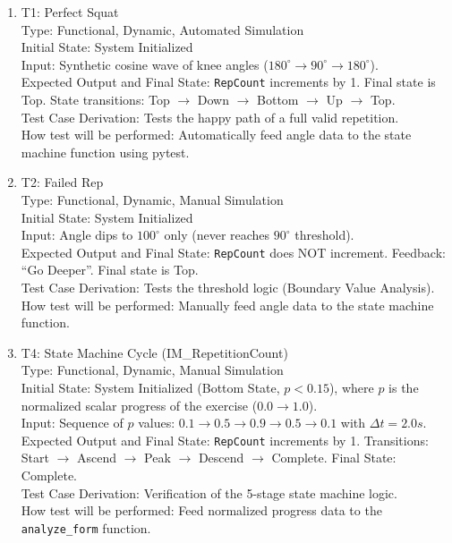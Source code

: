 \documentclass[12pt, titlepage]{article}
\begin{document}
\begin{enumerate}
\item{T1: Perfect Squat\\}
Type: Functional, Dynamic, Automated Simulation\\
Initial State: System Initialized\\
Input: Synthetic cosine wave of knee angles ($180^\circ \rightarrow 90^\circ \rightarrow 180^\circ$).\\
Expected Output and Final State: \texttt{RepCount} increments by 1. Final state is Top. State transitions: Top $\rightarrow$ Down $\rightarrow$ Bottom $\rightarrow$ Up $\rightarrow$ Top.\\
Test Case Derivation: Tests the happy path of a full valid repetition.\\
How test will be performed: Automatically feed angle data to the state machine function using pytest.

\item{T2: Failed Rep\\}
Type: Functional, Dynamic, Manual Simulation\\
Initial State: System Initialized\\
Input: Angle dips to $100^\circ$ only (never reaches $90^\circ$ threshold).\\
Expected Output and Final State: \texttt{RepCount} does NOT increment. Feedback: ``Go Deeper''. Final state is Top.\\
Test Case Derivation: Tests the threshold logic (Boundary Value Analysis).\\
How test will be performed: Manually feed angle data to the state machine function.

\item{T4: State Machine Cycle (IM\_RepetitionCount)\\}
Type: Functional, Dynamic, Manual Simulation\\
Initial State: System Initialized (Bottom State, $p < 0.15$), where $p$ is the normalized scalar progress of the exercise ($0.0 \rightarrow 1.0$).\\
Input: Sequence of $p$ values: $0.1 \rightarrow 0.5 \rightarrow 0.9 \rightarrow 0.5 \rightarrow 0.1$ with $\Delta t = 2.0s$.\\
Expected Output and Final State: \texttt{RepCount} increments by 1. Transitions: Start $\rightarrow$ Ascend $\rightarrow$ Peak $\rightarrow$ Descend $\rightarrow$ Complete. Final State: Complete.\\
Test Case Derivation: Verification of the 5-stage state machine logic.\\
How test will be performed: Feed normalized progress data to the \texttt{analyze\_form} function.


\end{enumerate}
\end{document}
